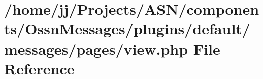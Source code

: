 \hypertarget{components_2_ossn_messages_2plugins_2default_2messages_2pages_2view_8php}{}\section{/home/jj/\+Projects/\+A\+S\+N/components/\+Ossn\+Messages/plugins/default/messages/pages/view.php File Reference}
\label{components_2_ossn_messages_2plugins_2default_2messages_2pages_2view_8php}
